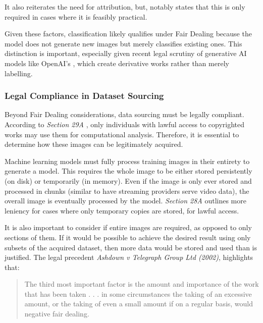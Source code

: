                   It also reiterates the need for attribution, but, notably states that this is only required in cases where it is feasibly practical.
  
                  Given these factors, classification likely qualifies under Fair Dealing because the model does not generate new images but merely classifies existing ones. This distinction is important, especially given recent legal scrutiny of generative AI models like OpenAI’s , which create derivative works rather than merely labelling.
  
              \subsubsection{Legal Compliance in Dataset Sourcing}
  
                  Beyond Fair Dealing considerations, data sourcing must be legally compliant. According to \textit{Section 29A} \cite{cdpa1988}, only individuals with lawful access to copyrighted works may use them for computational analysis. Therefore, it is essential to determine how these images can be legitimately acquired.
  
                  Machine learning models must fully process training images in their entirety to generate a model. This requires the whole image to be either stored persistently (on disk) or temporarily (in memory). Even if the image is only ever stored and processed in chunks (similar to have streaming providers serve video data), the overall image is eventually processed by the model. \textit{Section 28A} outlines more leniency for cases where only temporary copies are stored, for lawful access.
  
                  It is also important to consider if entire images are required, as opposed to only sections of them. If it would be possible to achieve the desired result using only subsets of the acquired dataset, then more data would be stored and used than is justified. The legal precedent \textit{Ashdown v Telegraph Group Ltd (2002)}, highlights that:
  
                  \begin{quote}
                      The third most important factor is the amount and importance of the work that has been taken . . . in some circumstances the taking of an excessive amount, or the taking of even a small amount if on a regular basis, would negative fair dealing. \cite{tmlocad}
                  \end{quote}
  

